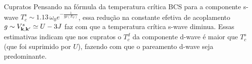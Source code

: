 \documentclass[a4paper,10pt]{article}
\begin{document}
\begin{section}{Cupratos}
Pensando na fórmula da temperatura crítica BCS para a componente s-wave $T_c^s \sim 1.13 \, \omega_0 e^{-\frac{1}{g \rho(E_F)}}$, essa redução na constante efetiva de acoplamento $g \sim V_{\vb{k},\vb{k}'}^s \simeq U-3J$ faz com que a temperatura crítica s-wave diminua. Essas estimativas indicam que nos cupratos o $T_c^d$ da componente d-wave é maior que $T_c^s$ (que foi suprimido por $U$), fazendo com que o pareamento d-wave seja predominante.

\end{section}


%


\end{document}
